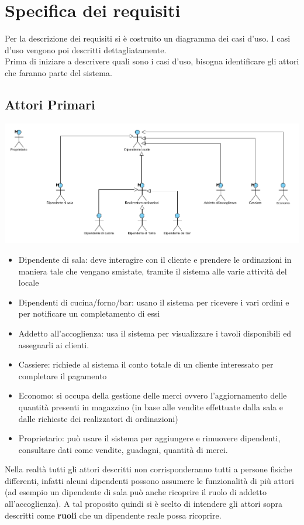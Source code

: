 \chapter{Specifica dei requisiti}
Per la descrizione dei requisiti si è costruito un diagramma dei casi d'uso. I casi d'uso vengono poi descritti dettagliatamente.
\\Prima di iniziare a descrivere quali sono i casi d'uso, bisogna identificare gli attori che faranno parte del sistema.

\section{Attori Primari}
\includegraphics[width=\textwidth]{Immagini/AttoriPrimari.png}
\begin{itemize}
	\item Dipendente di sala: deve interagire con il cliente e prendere le ordinazioni in maniera tale che vengano smistate, tramite il sistema alle varie attività del locale
	\item Dipendenti di cucina/forno/bar: usano il sistema per ricevere i vari ordini e per notificare un completamento di essi
	\item Addetto all'accoglienza: usa il sistema per visualizzare i tavoli disponibili ed assegnarli ai clienti.
	\item Cassiere: richiede al sistema il conto totale di un cliente interessato per completare il pagamento
	\item Economo: si occupa della gestione delle merci ovvero l'aggiornamento delle quantità presenti in magazzino (in base alle vendite effettuate dalla sala e dalle richieste dei realizzatori di ordinazioni)
	\item Proprietario: può usare il sistema per aggiungere e rimuovere dipendenti, consultare dati come vendite, guadagni, quantità di merci.
\end{itemize}
Nella realtà tutti gli attori descritti non corrisponderanno tutti a persone fisiche differenti, infatti alcuni dipendenti possono assumere le funzionalità di più attori (ad esempio un dipendente di sala può anche ricoprire il ruolo di addetto all'accoglienza). A tal proposito quindi si è scelto di intendere gli attori sopra descritti come \textbf{ruoli} che un dipendente reale possa ricoprire.

